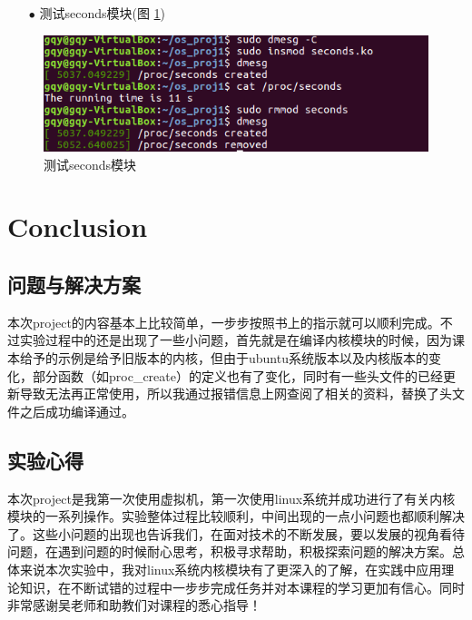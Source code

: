 \documentclass{article}
\begin{document}
\begin{itemize}
\item[$\bullet$]测试seconds模块(图 \ref{测试seconds模块})
\end{itemize}
\begin{figure}[htbp]
		\centering
		\includegraphics{seconds}
		\caption{测试seconds模块} \label{测试seconds模块}
\end{figure}
\section{Conclusion}
\subsection{问题与解决方案}
本次project的内容基本上比较简单，一步步按照书上的指示就可以顺利完成。不过实验过程中的还是出现了一些小问题，首先就是在编译内核模块的时候，因为课本给予的示例是给予旧版本的内核，但由于ubuntu系统版本以及内核版本的变化，部分函数（如proc\_create）的定义也有了变化，同时有一些头文件的已经更新导致无法再正常使用，所以我通过报错信息上网查阅了相关的资料，替换了头文件之后成功编译通过。

\subsection{实验心得}
本次project是我第一次使用虚拟机，第一次使用linux系统并成功进行了有关内核模块的一系列操作。实验整体过程比较顺利，中间出现的一点小问题也都顺利解决了。这些小问题的出现也告诉我们，在面对技术的不断发展，要以发展的视角看待问题，在遇到问题的时候耐心思考，积极寻求帮助，积极探索问题的解决方案。总体来说本次实验中，我对linux系统内核模块有了更深入的了解，在实践中应用理论知识，在不断试错的过程中一步步完成任务并对本课程的学习更加有信心。同时非常感谢吴老师和助教们对课程的悉心指导！



\end{document}
